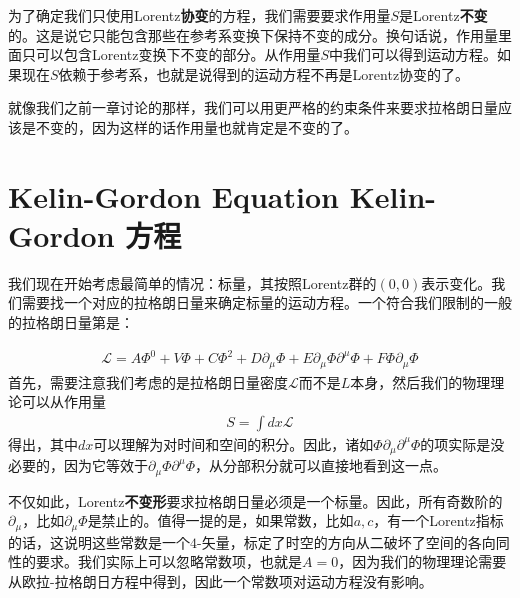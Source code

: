 为了确定我们只使用Lorentz{\bf 协变}的方程，我们需要要求作用量$S$是Lorentz{\bf 不变}的。这是说它只能包含那些在参考系变换下保持不变的成分。换句话说，作用量里面只可以包含Lorentz变换下不变的部分。从作用量$S$中我们可以得到运动方程。如果现在$S$依赖于参考系，也就是说得到的运动方程不再是Lorentz协变的了。

就像我们之前一章讨论的那样，我们可以用更严格的约束条件来要求拉格朗日量应该是不变的，因为这样的话作用量也就肯定是不变的了。

\section[Kelin-Gordon 方程]{Kelin-Gordon Equation Kelin-Gordon 方程}\label{sec6.2}

我们现在开始考虑最简单的情况：标量，其按照Lorentz群的$(0,0)$表示变化。我们需要找一个对应的拉格朗日量来确定标量的运动方程。一个符合我们限制的一般的拉格朗日量第是：

\begin{align}
\mathcal{L} = A\Phi^0+V\Phi+C\Phi^2+D\partial_\mu\Phi+E\partial_\mu\Phi\partial^\mu\Phi+F\Phi\partial_\mu\Phi
\end{align}
首先，需要注意我们考虑的是拉格朗日量密度$\mathcal{L}$而不是$L$本身，然后我们的物理理论可以从作用量
\begin{align}
S = \int dx\mathcal{L}
\end{align}
得出，其中$dx$可以理解为对时间和空间的积分。因此，诸如$\Phi\partial_\mu\partial^\mu\Phi$的项实际是没必要的，因为它等效于$\partial_\mu\Phi\partial^\mu\Phi$，从分部积分就可以直接地看到这一点。

不仅如此，Lorentz{\bf 不变形}要求拉格朗日量必须是一个标量。因此，所有奇数阶的$\partial_\mu$，比如$\partial_\mu\Phi$是禁止的。值得一提的是，如果常数，比如$a, c$，有一个Lorentz指标的话，这说明这些常数是一个$4$-矢量，标定了时空的方向从二破坏了空间的各向同性的要求。我们实际上可以忽略常数项，也就是$A=0$，因为我们的物理理论需要从欧拉-拉格朗日方程中得到，因此一个常数项对运动方程没有影响。

